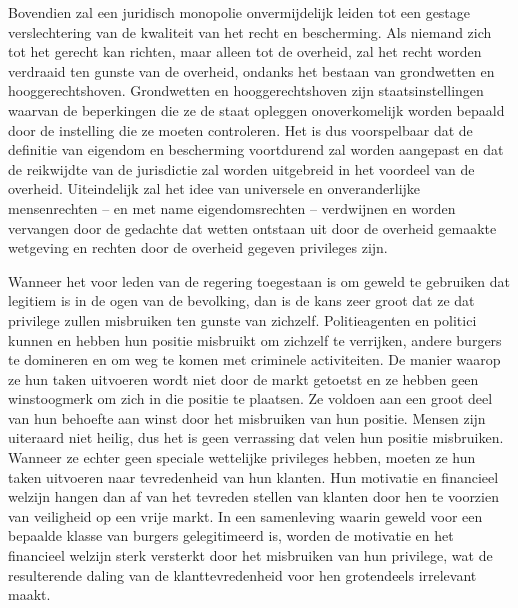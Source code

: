 \begin{blockquotebox}
Bovendien zal een juridisch monopolie onvermijdelijk leiden tot een gestage verslechtering van de kwaliteit van het recht en bescherming. Als niemand zich tot het gerecht kan richten, maar alleen tot de overheid, zal het recht worden verdraaid ten gunste van de overheid, ondanks het bestaan van grondwetten en hooggerechtshoven. Grondwetten en hooggerechtshoven zijn staatsinstellingen waarvan de beperkingen die ze de staat opleggen onoverkomelijk worden bepaald door de instelling die ze moeten controleren. Het is dus voorspelbaar dat de definitie van eigendom en bescherming voortdurend zal worden aangepast en dat de reikwijdte van de jurisdictie zal worden uitgebreid in het voordeel van de overheid. Uiteindelijk zal het idee van universele en onveranderlijke mensenrechten -- en met name eigendomsrechten -- verdwijnen en worden vervangen door de gedachte dat wetten ontstaan uit door de overheid gemaakte wetgeving en rechten door de overheid gegeven privileges zijn.\footnotemark
\end{blockquotebox}

Wanneer het voor leden van de regering toegestaan is om geweld te gebruiken dat legitiem is in de ogen van de bevolking, dan is de kans zeer groot dat ze dat privilege zullen misbruiken ten gunste van zichzelf. Politieagenten en politici kunnen en hebben hun positie misbruikt om zichzelf te verrijken, andere burgers te domineren en om weg te komen met criminele activiteiten. De manier waarop ze hun taken uitvoeren wordt niet door de markt getoetst en ze hebben geen winstoogmerk om zich in die positie te plaatsen. Ze voldoen aan een groot deel van hun behoefte aan winst door het misbruiken van hun positie. Mensen zijn uiteraard niet heilig, dus het is geen verrassing dat velen hun positie misbruiken. Wanneer ze echter geen speciale wettelijke privileges hebben, moeten ze hun taken uitvoeren naar tevredenheid van hun klanten. Hun motivatie en financieel welzijn hangen dan af van het tevreden stellen van klanten door hen te voorzien van veiligheid op een vrije markt. In een samenleving waarin geweld voor een bepaalde klasse van burgers gelegitimeerd is, worden de motivatie en het financieel welzijn sterk versterkt door het misbruiken van hun privilege, wat de resulterende daling van de klanttevredenheid voor hen grotendeels irrelevant maakt.

